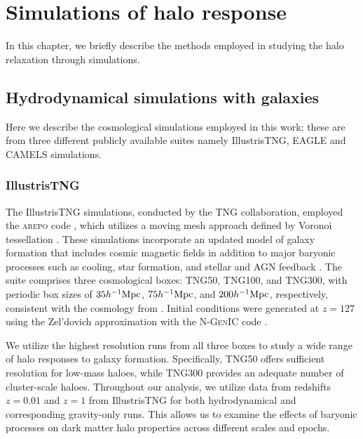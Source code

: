 \chapter{Simulations of halo response}
\label{chap:sims-hals}

In this chapter, we briefly describe the methods employed in studying the halo relaxation through simulations.

\section{Hydrodynamical simulations with galaxies}
\label{sec:sims}
Here we describe the cosmological simulations employed in this work; these are from three different publicly available suites namely IllustrisTNG, EAGLE and CAMELS simulations.
\subsection{IllustrisTNG}
\label{sec:sims-IllTNG}
The IllustrisTNG simulations, conducted by the TNG collaboration, employed the \textsc{arepo} code \citep[][]{2020ApJS..248...32W}, which utilizes a moving mesh approach defined by Voronoi tessellation \citep[][]{2010MNRAS.401..791S}. These simulations incorporate an updated model of galaxy formation that includes cosmic magnetic fields in addition to major baryonic processes such as cooling, star formation, and stellar and AGN feedback \citep[][]{2017MNRAS.465.3291W,2018MNRAS.473.4077P}. The suite comprises three cosmological boxes: TNG50, TNG100, and TNG300, with periodic box sizes of $35 h^{-1}{\rm Mpc}$, $75 h^{-1}{\rm Mpc}$, and $200 h^{-1}{\rm Mpc}$, respectively, consistent with the cosmology from \cite{2016A&A...594A..13P}. Initial conditions were generated at $z=127$ using the Zel'dovich approximation \citep[][]{1970A&A.....5...84Z} with the \textsc{N-GenIC} code \citep[][]{2015ascl.soft02003S}. 

We utilize the highest resolution runs from all three boxes to study a wide range of halo responses to galaxy formation. Specifically, TNG50 offers sufficient resolution for low-mass haloes, while TNG300 provides an adequate number of cluster-scale haloes. Throughout our analysis, we utilize data from redshifts $z=0.01$ and $z=1$ from IllustrisTNG for both hydrodynamical and corresponding gravity-only runs. This allows us to examine the effects of baryonic processes on dark matter halo properties across different scales and epochs.

